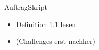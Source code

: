 \begin{frame}{Auftrag}{Skript}
    \begin{itemize}
        \item Definition 1.1 lesen
        \item {} (Challenges erst nachher)
    \end{itemize}
\end{frame}